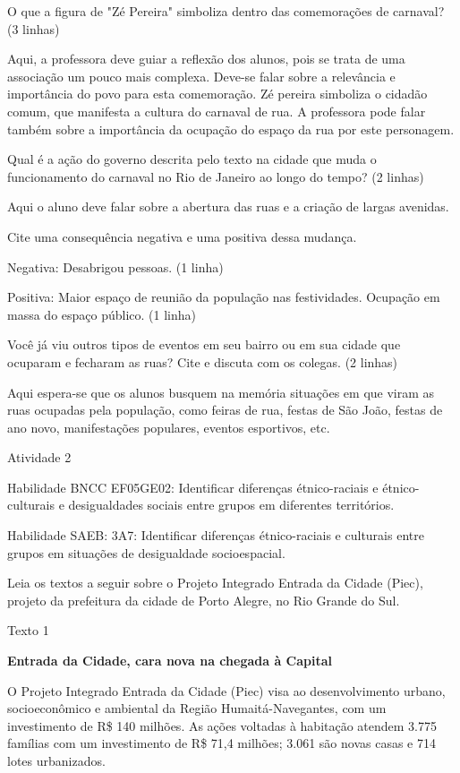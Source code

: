 O que a figura de "Zé Pereira" simboliza dentro das comemorações de
carnaval? (3 linhas)

Aqui, a professora deve guiar a reflexão dos alunos, pois se trata de
uma associação um pouco mais complexa. Deve-se falar sobre a relevância
e importância do povo para esta comemoração. Zé pereira simboliza o
cidadão comum, que manifesta a cultura do carnaval de rua. A professora
pode falar também sobre a importância da ocupação do espaço da rua por
este personagem.

Qual é a ação do governo descrita pelo texto na cidade que muda o
funcionamento do carnaval no Rio de Janeiro ao longo do tempo? (2
linhas)

Aqui o aluno deve falar sobre a abertura das ruas e a criação de largas
avenidas.

Cite uma consequência negativa e uma positiva dessa mudança.

Negativa: Desabrigou pessoas. (1 linha)

Positiva: Maior espaço de reunião da população nas festividades.
Ocupação em massa do espaço público. (1 linha)

Você já viu outros tipos de eventos em seu bairro ou em sua cidade que
ocuparam e fecharam as ruas? Cite e discuta com os colegas. (2 linhas)

Aqui espera-se que os alunos busquem na memória situações em que viram
as ruas ocupadas pela população, como feiras de rua, festas de São João,
festas de ano novo, manifestações populares, eventos esportivos, etc.

Atividade 2

Habilidade BNCC EF05GE02: Identificar diferenças étnico-raciais e
étnico-culturais e desigualdades sociais entre grupos em diferentes
territórios.

Habilidade SAEB: 3A7: Identificar diferenças étnico-raciais e culturais
entre grupos em situações de desigualdade socioespacial.

Leia os textos a seguir sobre o Projeto Integrado Entrada da Cidade
(Piec), projeto da prefeitura da cidade de Porto Alegre, no Rio Grande
do Sul.

Texto 1

\textbf{Entrada da Cidade, cara nova na chegada à Capital}

O Projeto Integrado Entrada da Cidade (Piec) visa ao desenvolvimento
urbano, socioeconômico e ambiental da Região Humaitá-Navegantes, com um
investimento de R\$ 140 milhões. As ações voltadas à habitação atendem
3.775 famílias com um investimento de R\$ 71,4 milhões; 3.061 são novas
casas e 714 lotes urbanizados.


